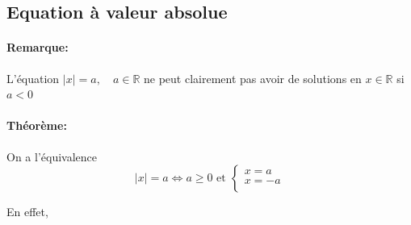 \documentclass[
    11pt,
    a4paper,
    oneside,
    headinlcude, footinclude,
    twoside,
]{report}
\begin{document}
\subsection{Equation \`a valeur absolue}

\paragraph{Remarque:}

L'\'equation $|x| = a, \quad a \in \mathbb{R}$ ne peut clairement pas avoir de
solutions en $x \in \mathbb{R}$ si $a < 0$

\paragraph{Théorème:}

On a l'\'equivalence $$|x| = a \iff a \geq 0 \text{ et }  \left\{
    \begin{array}{l}
    x = a\\
    x = -a\\
    \end{array}
\right.$$


En effet, 
\end{document}
